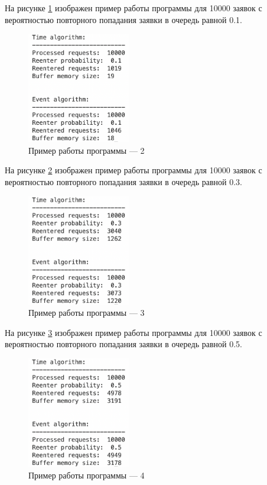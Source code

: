 \documentclass[12pt]{report}
\begin{document}
На рисунке \ref{fig:pic2} изображен пример работы программы для 10000 заявок с вероятностью повторного попадания заявки в очередь равной 0.1.

\begin{figure}[h!btp]
	\centering
	\includegraphics[width=0.4\textwidth]{inc/pic2.png}
	\caption{Пример работы программы --- 2}
	\label{fig:pic2}	
\end{figure}
\clearpage

На рисунке \ref{fig:pic3} изображен пример работы программы для 10000 заявок с вероятностью повторного попадания заявки в очередь равной 0.3.

\begin{figure}[h!btp]
	\centering
	\includegraphics[width=0.4\textwidth]{inc/pic3.png}
	\caption{Пример работы программы --- 3}
	\label{fig:pic3}	
\end{figure}

На рисунке \ref{fig:pic4} изображен пример работы программы для 10000 заявок с вероятностью повторного попадания заявки в очередь равной 0.5.

\begin{figure}[h!btp]
	\centering
	\includegraphics[width=0.4\textwidth]{inc/pic4.png}
	\caption{Пример работы программы --- 4}
	\label{fig:pic4}	
\end{figure}
\clearpage
\end{document}
